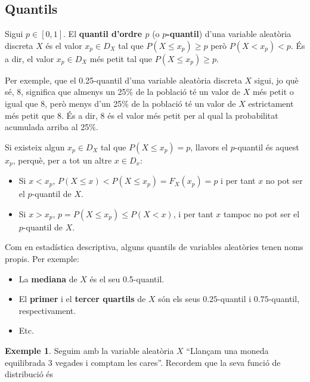 \documentclass[
]{book}
\providecommand{\tightlist}{%
  \setlength{\itemsep}{0pt}\setlength{\parskip}{0pt}}
\renewcommand{\leq}{\leqslant}
\renewcommand{\geq}{\geqslant}
\newenvironment{rmdblock}[1]
  {
  \begin{itemize}
  \renewcommand{\labelitemi}{
    \raisebox{-.7\height}[0pt][0pt]{
      {\setkeys{Gin}{width=3em,keepaspectratio}\texttt{[image: Bioestadística-II\_files/figure-html/\#1]}}
    }
  }
  \setlength{\fboxsep}{1em}
  \begin{kframe}
  \item
  }
  {
  \end{kframe}
  \end{itemize}
  }
\newenvironment{rmdnote}
  {\begin{rmdblock}{note}}
  {\end{rmdblock}}
\theoremstyle{definition}
\theoremstyle{definition}
\newtheorem{example}{Exemple}[chapter]
\theoremstyle{definition}
\theoremstyle{remark}
\begin{document}
\hypertarget{quantils}{%
\subsection{Quantils}\label{quantils}}

Sigui \(p\in [0,1]\). El \textbf{quantil d'ordre \(p\)} (o \textbf{\(p\)-quantil}) d'una variable aleatòria discreta \(X\) és el valor \(x_p\in D_X\) tal que \(P(X\leq x_p)\geq p\) però \(P(X< x_p)<p\). És a dir, el valor \(x_p\in D_X\) més petit tal que \(P(X\leq x_p)\geq p\).

Per exemple, que el 0.25-quantil d'una variable aleatòria discreta \(X\) sigui, jo què sé, 8, significa que almenys un 25\% de la població té un valor de \(X\) més petit o igual que 8, però menys d'un 25\% de la població té un valor de \(X\) estrictament més petit que 8. És a dir, 8 és el valor més petit per al qual la probabilitat acumulada arriba al 25\%.

\begin{rmdnote}
Si existeix algun \(x_p\in D_X\) tal que \(P(X\leq x_p)=p\), llavors el \(p\)-quantil és aquest \(x_p\), perquè, per a tot un altre \(x\in D_x\):

\begin{itemize}
\tightlist
\item
  Si \(x<x_p\), \(P(X\leq x)<P(X\leq x_p)=F_X(x_p)=p\) i per tant \(x\) no pot ser el \(p\)-quantil de \(X\).
\item
  Si \(x>x_p\), \(p=P(X\leq x_p)\leq P(X<x)\), i per tant \(x\) tampoc no pot ser el \(p\)-quantil de \(X\).
\end{itemize}
\end{rmdnote}

Com en estadística descriptiva, alguns quantils de variables aleatòries tenen noms propis. Per exemple:

\begin{itemize}
\item
  La \textbf{mediana} de \(X\) és el seu 0.5-quantil.
\item
  El \textbf{primer} i el \textbf{tercer quartils} de \(X\) són els seus \(0.25\)-quantil i \(0.75\)-quantil, respectivament.
\item
  Etc.
\end{itemize}

\begin{example}
\protect\hypertarget{exm:unnamed-chunk-25}{}{\label{exm:unnamed-chunk-25} }Seguim amb la variable aleatòria \(X\) ``Llançam una moneda equilibrada 3 vegades i comptam les cares''. Recordem que la seva funció de distribució és
\end{example}
\end{document}
